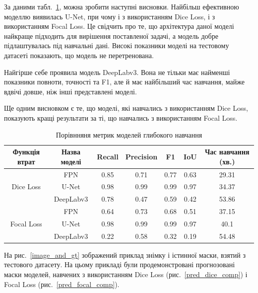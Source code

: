 За даними табл.~\ref{int_comp}, можна зробити наступні висновки.
Найбільш ефективною моделлю виявилась U-Net, при чому і з використанням
Dice Loss, і з використанням Focal Loss. Це свідчить про те, що
архітектура даної моделі найкраще підходить для вирішення поставленої
задачі, а модель добре підлаштувалась під навчальні дані. Високі показники
моделі на тестовому датасеті показають, що модель не перетренована.

Найгірше себе проявила модель DeepLabv3. Вона не тільки має найменші показники
повноти, точності та F1, але й має найбільший час навчання, майже вдвічі довше,
ніж інші представлені моделі.

Ще одним висновком є те, що моделі, які навчались з використанням Dice Loss,
показують кращі результати за ті, що навчались з використанням Focal Loss.

\begin{table}[ht]
      \setfontsize{12pt}
      \caption{Порівнняня метрик моделей глибокого навчання}
      \label{int_comp}
      \centering
      \begin{tabular}{|c|c|c|c|c|c|c|}
            \hline
            Функція втрат               & Назва моделі & Recall & Precision & F1   & IoU  & Час навчання (хв.) \\ \hline
            \multirow{3}{*}{Dice Loss}  & FPN          & 0.85   & 0.71      & 0.77 & 0.63 & 29.31              \\ \cline{2-7}
                                        & U-Net        & 0.98   & 0.99      & 0.99 & 0.97 & 34.37              \\ \cline{2-7}
                                        & DeepLabv3    & 0.78   & 0.47      & 0.59 & 0.42 & 53.86              \\ \hline
            \multirow{3}{*}{Focal Loss} & FPN          & 0.64   & 0.73      & 0.68 & 0.51 & 37.15              \\ \cline{2-7}
                                        & U-Net        & 0.98   & 0.99      & 0.99 & 0.97 & 40.1               \\ \cline{2-7}
                                        & DeepLabv3    & 0.22   & 0.58      & 0.32 & 0.19 & 54.48              \\ \hline
      \end{tabular}
\end{table}

На рис.~\ref{image_and_gt} зображений приклад знімку і істинної маски,
взятий з тестового датасету. На цьому прикладі були продемонстровані
прогнозовані маски моделей, навчених з використанням Dice Loss (рис.~\ref{pred_dice_comp})
і Focal Loss (рис.~\ref{pred_focal_comp}).

